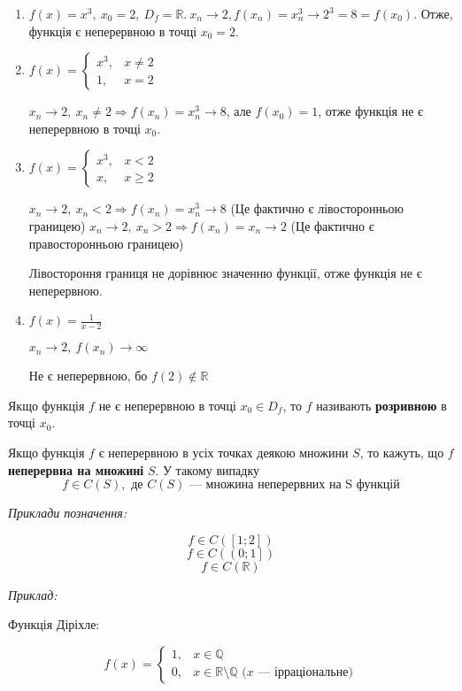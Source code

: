 \documentclass[12pt]{report}
\begin{document}
\begin{enumerate}
    \item $f(x) = x^3,\ x_0 = 2,\ D_f = \mathbb{R}.\ x_n \to 2, f(x_n) = x_{n}^3 \to 2^3 = 8 = f(x_0)$. Отже, функція є неперервною в точці $x_0 = 2$.
    \item $f(x) = \begin{cases} x^3, & x \neq 2  \\ 1, & x = 2\end{cases}$ 
    
    $x_n \to 2,\ x_n \neq 2 \Longrightarrow f(x_n) = x_n^3 \to 8$, але $f(x_0) = 1$, отже функція не є неперервною в точці $x_0$.
    \item $f(x) = \begin{cases} x^3, & x < 2  \\ x, & x \geq 2\end{cases}$
    
    $x_n \to 2,\ x_n < 2 \Longrightarrow f(x_n) = x_n^3 \to 8$ (Це фактично є лівосторонньою границею)
    $x_n \to 2,\ x_n > 2 \Longrightarrow f(x_n) = x_n \to 2$ (Це фактично є правосторонньою границею)
    
    Лівостороння границя не дорівнює значенню функції, отже функція не є неперервною.
    
    \item $f(x) = \frac{1}{x-2}$
    
    $x_n \to 2,\ f(x_n) \to \infty$
    
    Не є неперервною, бо $f(2) \notin \mathbb{R}$ 
\end{enumerate}

Якщо функція $f$ не є неперервною в точці $x_0 \in D_f$, то $f$ називають \textbf{розривною} в точці $x_0$.

Якщо функція $f$ є неперервною в усіх точках деякою множини $S$, то кажуть, що $f$ \textbf{неперервна на множині} $S$. У такому випадку
$$f \in C(S), \textrm{ де $C(S)$ --- множина неперервних на S функцій}$$

\textit{Приклади позначення:}

$$f \in C(\left[ 1;2 \right])$$
$$f \in C( \left( 0;1 \right])$$
$$f \in C(\mathbb{R})$$

\textit{Приклад:}

Функція Діріхле: 

$$f(x) = \begin{cases} 1, & x \in \mathbb{Q}  \\ 0, & x \in \mathbb{R}\setminus \mathbb{Q} \textrm{ ($x$ --- ірраціональне)}\end{cases}$$
\end{document}
